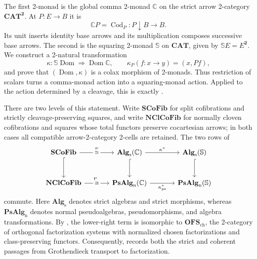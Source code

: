 \documentclass[11pt]{article}
\theoremstyle{plain}
\theoremstyle{definition}
\theoremstyle{remark}
\newcommand{\CAT}{\mathbf{CAT}}
\newcommand{\SCoFib}{\mathbf{SCoFib}}
\newcommand{\NClCoFib}{\mathbf{NClCoFib}}
\newcommand{\Alg}{\mathbf{Alg}_{\mathrm{s}}}
\newcommand{\PsAlg}{\mathbf{PsAlg}}
\newcommand{\OFSch}{\mathbf{OFS}_{\mathrm{ch}}}
\newcommand{\Dom}{\operatorname{Dom}}
\newcommand{\Cod}{\operatorname{Cod}}
\newcommand{\C}{\mathbb{C}}
\newcommand{\Sq}{\mathbb{S}}
\numberwithin{equation}{section}
\begin{document}
The first 2-monad is the global comma 2-monad $\C$ on the strict arrow
2-category $\CAT^{\mathbf 2}$.  At $P\colon E\to B$ it is
\begin{equation*}
  \C P=\Cod_{P}\colon
  P\!\downarrow\!B\longrightarrow B.
\end{equation*}
Its unit inserts identity base arrows and its multiplication composes
successive base arrows.  The second is the squaring 2-monad $\Sq$ on
$\CAT$, given by $\Sq E=E^{\mathbf 2}$.  We construct a 2-natural
transformation
\begin{equation*}
  \kappa\colon\Sq\Dom\Longrightarrow\Dom\C,
  \qquad
  \kappa_P(f\colon x\to y)=(x,Pf),
\end{equation*}
and prove that $(\Dom,\kappa)$ is a colax morphism of 2-monads.  Thus
restriction of scalars turns a comma-monad action into a squaring-monad
action.  Applied to the action determined by a cleavage, this is exactly
.

There are two levels of this statement.  Write $\SCoFib$ for split
cofibrations and strictly cleavage-preserving squares, and write
$\NClCoFib$ for normally cloven cofibrations and squares whose total
functors preserve cocartesian arrows; in both cases all compatible
arrow-2-category 2-cells are retained.  The two rows of
\begin{equation}
\begin{tikzcd}[column sep=large,row sep=large]
\SCoFib
  \arrow[r,"\Gamma", "\cong" description]
  \arrow[d,hook]
& \Alg(\C)
  \arrow[r,"\kappa^{*}"]
  \arrow[d,hook]
& \Alg(\Sq)
  \arrow[d,hook] \\
\NClCoFib
  \arrow[r,"\Gamma_{\mathrm n}", "\cong" description]
& \PsAlg_{\mathrm n}(\C)
  \arrow[r,"\kappa^{*}_{\mathrm{ps}}"']
& \PsAlg_{\mathrm n}(\Sq)
\end{tikzcd}
\label{eq:intro-architecture}
\end{equation}
commute.  Here $\Alg$ denotes strict algebras and strict morphisms,
whereas $\PsAlg_{\mathrm n}$ denotes normal pseudoalgebras,
pseudomorphisms, and algebra transformations.  By
\citet[Theorem~2.4]{KorostenskiTholen1993}, the lower-right term is
isomorphic to
$\OFSch$, the 2-category of orthogonal factorization systems with normalized
chosen factorizations and class-preserving functors.  Consequently,
 records both the strict and coherent
passages from Grothendieck transport to factorization.
\end{document}
